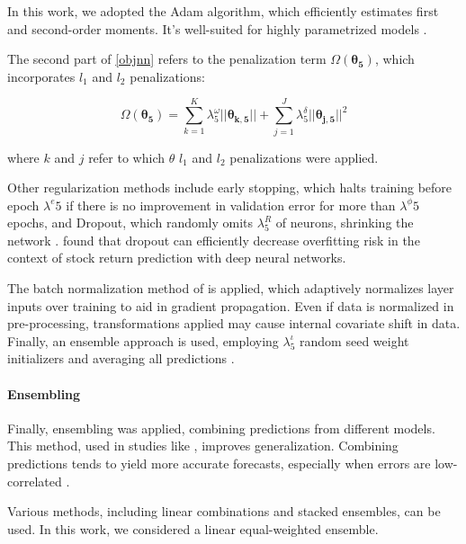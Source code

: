 \documentclass[preprint,12pt,authoryear]{elsarticle}
\begin{document}
In this work, we adopted the Adam algorithm, which efficiently estimates first and second-order moments. It's well-suited for highly parametrized models \citep{kingmaba2014}.
     
The second part of \ref{objnn} refers to the penalization term $\Omega(\mathbf{\theta_{5}})$, which incorporates $l_{1}$ and $l_{2}$ penalizations:

\begin{equation}
\Omega(\mathbf{\theta_{5}}) = \sum_{k=1}^{K} \lambda^{\omega}_{5} ||\mathbf{\theta_{k,5}}|| + \sum_{j=1}^{J}\lambda^{\delta}_{5}||\mathbf{\theta_{j,5}}||^{2}
\end{equation}

where $k$ and $j$ refer to which $\theta$ $l_{1}$ and $l_{2}$ penalizations were applied.


Other regularization methods include early stopping, which halts training before epoch $\lambda^{e}{5}$ if there is no improvement in validation error for more than $\lambda^{\phi}{5}$ epochs, and Dropout, which randomly omits $\lambda^{R}_{5}$ of neurons, shrinking the network \citep{srivastavaetal2014}. \citet{lee2020} found that dropout can efficiently decrease overfitting risk in the context of stock return prediction with deep neural networks.

The batch normalization method of \citet{ioffeszegedy2015} is applied, which adaptively normalizes layer inputs over training to aid in gradient propagation. Even if data is normalized in pre-processing, transformations applied may cause internal covariate shift in data. Finally, an ensemble approach is used, employing $\lambda^{\iota}_{5}$ random seed weight initializers and averaging all predictions \citep{dietterich2000}.

\paragraph{Ensembling}


Finally, ensembling was applied, combining predictions from different models. This method, used in studies like \citet{toochaeimoeini2023}, improves generalization. Combining predictions tends to yield more accurate forecasts, especially when errors are low-correlated \citep{kunchevawhitaker2003}.

Various methods, including linear combinations and stacked ensembles, can be used. In this work, we considered a linear equal-weighted ensemble.


\fi
\end{document}
